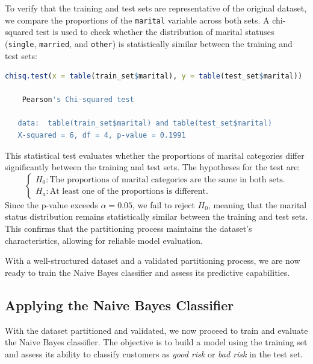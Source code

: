 \documentclass[
]{book}
\newcommand{\passthrough}[1]{#1}
\theoremstyle{definition}
\theoremstyle{definition}
\theoremstyle{definition}
\theoremstyle{definition}
\theoremstyle{remark}
\begin{document}
To verify that the training and test sets are representative of the original dataset, we compare the proportions of the \passthrough{\lstinline!marital!} variable across both sets. A chi-squared test is used to check whether the distribution of marital statuses (\passthrough{\lstinline!single!}, \passthrough{\lstinline!married!}, and \passthrough{\lstinline!other!}) is statistically similar between the training and test sets:

\begin{lstlisting}[language=R]
chisq.test(x = table(train_set$marital), y = table(test_set$marital))
   
    Pearson's Chi-squared test
   
   data:  table(train_set$marital) and table(test_set$marital)
   X-squared = 6, df = 4, p-value = 0.1991
\end{lstlisting}

This statistical test evaluates whether the proportions of marital categories differ significantly between the training and test sets. The hypotheses for the test are:\\
\[
\begin{cases}
H_0:  \text{The proportions of marital categories are the same in both sets.}\\
H_a:  \text{At least one of the proportions is different.}
\end{cases}
\]
Since the p-value exceeds \(\alpha = 0.05\), we fail to reject \(H_0\), meaning that the marital status distribution remains statistically similar between the training and test sets. This confirms that the partitioning process maintains the dataset's characteristics, allowing for reliable model evaluation.

With a well-structured dataset and a validated partitioning process, we are now ready to train the Naive Bayes classifier and assess its predictive capabilities.

\subsection*{Applying the Naive Bayes Classifier}\label{applying-the-naive-bayes-classifier}

With the dataset partitioned and validated, we now proceed to train and evaluate the Naive Bayes classifier. The objective is to build a model using the training set and assess its ability to classify customers as \emph{good risk} or \emph{bad risk} in the test set.
\end{document}
